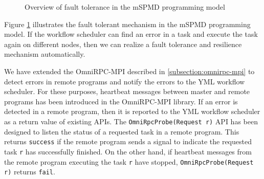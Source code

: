 \documentclass[graybox]{svmult}
\begin{document}
\begin{figure}[t]
 \begin{center}
\caption{Overview of fault tolerance in the mSPMD programming model}
\label{fig:overview-ft}
 \end{center}
\end{figure}

Figure \ref{fig:overview-ft} illustrates the fault tolerant mechanism in the mSPMD programming model. If the workflow scheduler can find an error in a task and execute the task again on different nodes, then we can realize a fault tolerance and resilience mechanism automatically. 

We have extended the OmniRPC-MPI described in \ref{subsection:omnirpc-mpi} to detect errors in remote programs and notify the errors to the YML workflow scheduler. For these purposes, heartbeat messages between master and remote programs has been introduced in the OmniRPC-MPI library. 
If an error is detected in a remote program, then it is reported to the YML workflow scheduler as a return value of existing APIs. 
The {\tt OmniRpcProbe(Request r)} API has been designed to listen the status of a requested task in a remote program. This returns {\tt success} if the remote program sends a signal to indicate the requested task {\tt r} has successfully finished. 
On the other hand, if heartbeat messages from the remote program executing the task {\tt r} have stopped, {\tt OmniRpcProbe(Request r)} returns {\tt fail}.
\end{document}

